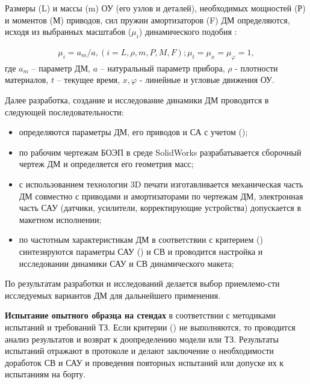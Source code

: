 Размеры (L) и массы (m) ОУ (его узлов и деталей), необходимых мощностей (Р) и моментов (М) приводов, сил пружин амортизаторов (F) ДМ определяются, исходя из выбранных масштабов ($\mu_i$) динамического подобия \cite[]{Babatko-a2-17}:

\begin{equation}
\label{eq:p2:23-a2}
\begin{alignedat}{2}
\mu_i=a_m / a, (i=L, \rho, m, P, M, F); \mu_t=\mu_x=\mu_\varphi=1 ,
\end{alignedat}
\end{equation}
где 
$a_m$ – параметр ДМ, 
$a$ – натуральный параметр прибора, 
$\rho$ - плотности материалов, 
$t$ – текущее время, 
$x, \varphi$ - линейные и угловые движения ОУ.

Далее разработка, создание и исследование динамики ДМ проводится в следующей последовательности:
\begin{itemize}
	\item определяются параметры ДМ, его приводов и СА с учетом (); 
	\item по рабочим чертежам БОЭП в среде SolidWorks разрабатывается сборочный чертеж ДМ и определяется его геометрия масс; 
	\item с использованием технологии 3D печати изготавливается механическая часть ДМ совместно с приводами и амортизаторами по чертежам ДМ, электронная часть САУ (датчики, усилители, корректирующие устройства) допускается в макетном исполнении; 
	\item по частотным характеристикам ДМ в соответствии с критерием () синтезируются параметры САУ () и СВ и проводится 
	настройка и исследовании динамики САУ и СВ динамического макета;
	
\end{itemize}

По результатам разработки и исследований делается выбор приемлемо-сти исследуемых вариантов ДМ для дальнейшего применения.

\textbf{Испытание опытного образца на стендах}
 в соответствии с методиками испытаний и требований ТЗ. Если критерии () не выполняются, то проводится анализ результатов и возврат к доопределению модели или ТЗ. Результаты испытаний отражают в протоколе и делают заключение о необходимости доработок СВ и САУ и проведения повторных испытаний или допуске их к испытаниям на борту. 

